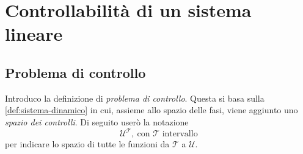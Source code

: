 \section{Controllabilità di un sistema lineare}

\subsection{Problema di controllo}
Introduco la definizione di \emph{problema di controllo}.
Questa si basa sulla \autoref{def:sistema-dinamico} in cui,
assieme allo spazio delle fasi, viene aggiunto uno \emph{spazio dei controlli}.
Di seguito userò la notazione
\begin{equation*}
    \mathcal U^{\mathcal T},\ \text{con } \mathcal T \text{ intervallo}
\end{equation*}
per indicare lo spazio di tutte le funzioni da $\mathcal T$ a $\mathcal U$.

